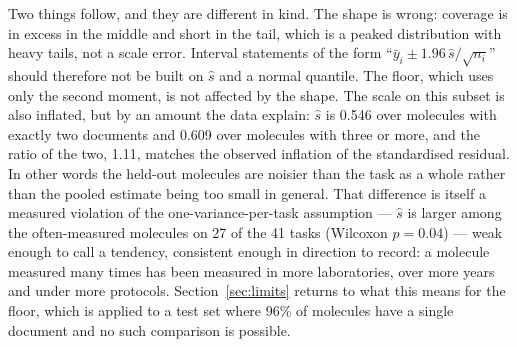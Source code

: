 Two things follow, and they are different in kind. The shape is wrong: coverage is in excess in the middle and short in the tail, which is a peaked distribution with heavy tails, not a scale error. Interval statements of the form ``$\bar y_i\pm1.96\,\hat s/\sqrt{n_i}$'' should therefore not be built on $\hat s$ and a normal quantile. The floor, which uses only the second moment, is not affected by the shape. The scale on this subset is also inflated, but by an amount the data explain: $\hat s$ is 0.546 over molecules with exactly two documents and 0.609 over molecules with three or more, and the ratio of the two, 1.11, matches the observed inflation of the standardised residual. In other words the held-out molecules are noisier than the task as a whole rather than the pooled estimate being too small in general. That difference is itself a measured violation of the one-variance-per-task assumption --- $\hat s$ is larger among the often-measured molecules on 27 of the 41 tasks (Wilcoxon $p=0.04$) --- weak enough to call a tendency, consistent enough in direction to record: a molecule measured many times has been measured in more laboratories, over more years and under more protocols. Section~\ref{sec:limits} returns to what this means for the floor, which is applied to a test set where 96\% of molecules have a single document and no such comparison is possible.
